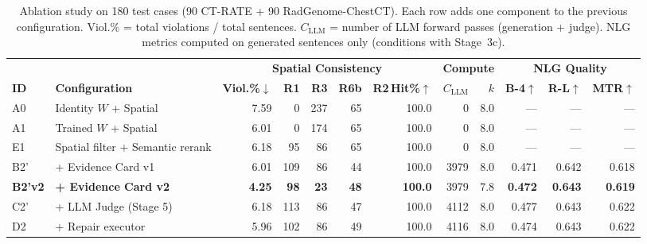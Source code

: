 \begin{table}[t]
\centering
\caption{Ablation study on 180 test cases (90 CT-RATE + 90 RadGenome-ChestCT). Each row adds one component to the previous configuration. Viol.\% = total violations / total sentences. $C_\text{LLM}$ = number of LLM forward passes (generation + judge). NLG metrics computed on generated sentences only (conditions with Stage~3c).}
\label{tab:ablation}
\small
\begin{tabular}{@{}ll rrrrr rr rrr@{}}
\toprule
 & & \multicolumn{5}{c}{\textbf{Spatial Consistency}} & \multicolumn{2}{c}{\textbf{Compute}} & \multicolumn{3}{c}{\textbf{NLG Quality}} \\
\cmidrule(lr){3-7} \cmidrule(lr){8-9} \cmidrule(lr){10-12}
\textbf{ID} & \textbf{Configuration} & \textbf{Viol.\%}$\downarrow$ & \textbf{R1} & \textbf{R3} & \textbf{R6b} & \textbf{R2\,Hit\%}$\uparrow$ & $C_\text{LLM}$ & $k$ & \textbf{B-4}$\uparrow$ & \textbf{R-L}$\uparrow$ & \textbf{MTR}$\uparrow$ \\
\midrule
A0 & Identity $W$ + Spatial & 7.59 & 0 & 237 & 65 & 100.0 & 0 & 8.0 & — & — & — \\
A1 & Trained $W$ + Spatial & 6.01 & 0 & 174 & 65 & 100.0 & 0 & 8.0 & — & — & — \\
E1 & Spatial filter + Semantic rerank & 6.18 & 95 & 86 & 65 & 100.0 & 0 & 8.0 & — & — & — \\
B2' & + Evidence Card v1 & 6.01 & 109 & 86 & 44 & 100.0 & 3979 & 8.0 & 0.471 & 0.642 & 0.618 \\
\textbf{B2'v2} & \textbf{+ Evidence Card v2} & \textbf{4.25} & \textbf{98} & \textbf{23} & \textbf{48} & \textbf{100.0} & 3979 & 7.8 & \textbf{0.472} & \textbf{0.643} & \textbf{0.619} \\
C2' & + LLM Judge (Stage 5) & 6.18 & 113 & 86 & 47 & 100.0 & 4112 & 8.0 & 0.477 & 0.643 & 0.622 \\
D2 & + Repair executor & 5.96 & 102 & 86 & 49 & 100.0 & 4116 & 8.0 & 0.474 & 0.643 & 0.622 \\
\bottomrule
\end{tabular}
\end{table}